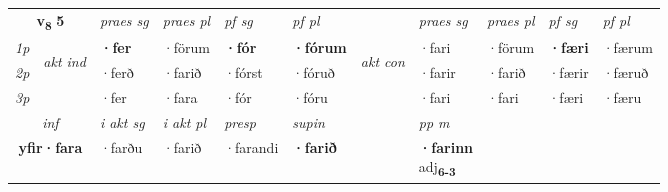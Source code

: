 \noindent
\begin{tabular}{lllllllllll} \toprule
\multicolumn{2}{c}{\textbf{v{\textsubscript{8}}} \Large{\textbf{5}}}  &  \textit{praes sg}  & \textit{praes pl}  &\textit{ pf sg} & \textit{pf pl} &  &  \textit{praes sg}  & \textit{praes pl}  & \textit{pf sg} & \textit{pf pl } \\*
	\cmidrule{3-6} \cmidrule{8-11}
 {\textit{1p}} & \multirow{3}{*}{\begin{turn}{90}\textit{akt ind}\end{turn}} & \textbf{·fer} & ·förum & \textbf{·fór} & \textbf{·fórum} & \multirow{3}{*}{\begin{turn}{90}\textit{akt con}\end{turn}} &·fari & ·förum & \textbf{·færi} & ·færum\\*
 {\textit{2p}} &  &  ·ferð  & ·farið & ·fórst & ·fóruð & & ·farir & ·farið & ·færir & ·færuð \\*
{\textit{3p}} &  & ·fer & ·fara & ·fór & ·fóru & & ·fari & ·fari& ·færi & ·færu \\*
\cmidrule{3-6} \cmidrule{8-11}

   \multicolumn{2}{c}{\textit{inf}}  & \textit{i akt sg} & \textit{i akt pl}   & \textit{presp} & \textit{supin}  && \textit{pp m} \\*
  \multicolumn{2}{c}{\textbf{yfir\allowbreak ·fara}} & ·farðu  & ·farið   & ·farandi &  \textbf{·farið}  && \specialcell{\textbf{·farinn} \\ adj\textbf{\textsubscript{6-3}}} \\*
\end{tabular}

